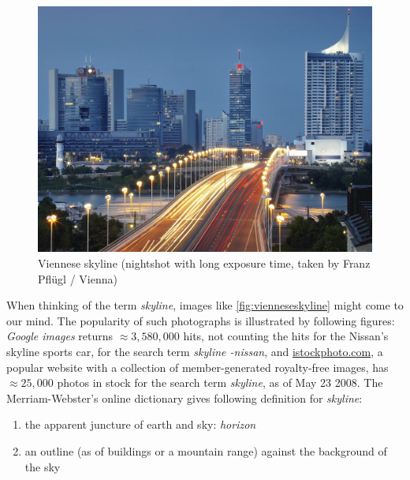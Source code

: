 \begin{figure}[htbp]
%
%
%
\centering
\includegraphics[scale=1.0]{photos/iStock_000002358169Large_100mm}%
\caption{Viennese skyline (nightshot with long exposure time, 
taken by Franz Pfl\"ugl / Vienna)}%
\label{fig:vienneseskyline}%
\end{figure}

When thinking of the term \emph{skyline}, images like 
\autoref{fig:vienneseskyline} might come to our mind.
The popularity of such photographs is illustrated by following figures:
\emph{Google images} returns $\approx 3{,}580{,}000$ hits, not
counting the hits for the Nissan's skyline sports car, for the search
term
\emph{skyline -nissan}, and 
%
\href{http://www.istockphoto.com/}{istockphoto.com}, 
a popular website with a collection of member-generated royalty-free images,
has $\approx 25{,}000$ photos in stock for the search term
\emph{skyline}, as of May 23 2008. 
The Merriam-Webster's online dictionary gives following definition for \emph{skyline}:
\begin{enumerate}
\item the apparent juncture of earth and sky: \emph{horizon}
\item an outline (as of buildings or a mountain range) against the
background of the sky
\end{enumerate}

